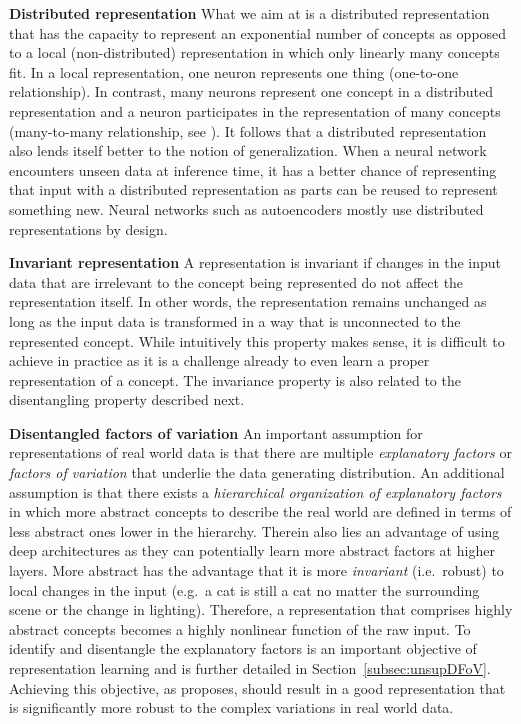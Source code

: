 \documentclass[a4paper,12pt]{report}
\begin{document}
\textbf{Distributed representation}
What we aim at is a distributed representation that has the capacity to represent an exponential number of concepts as opposed to a local (non-distributed) representation in which only linearly many concepts fit. In a local representation, one neuron represents one thing (one-to-one relationship). In contrast, many neurons represent one concept in a distributed representation and a neuron participates in the representation of many concepts (many-to-many relationship, see \cite{DistrRepHinton}). It follows that a distributed representation also lends itself better to the notion of generalization. When a neural network encounters unseen data at inference time, it has a better chance of representing that input with a distributed representation as parts can be reused to represent something new. Neural networks such as autoencoders mostly use distributed representations by design.

\textbf{Invariant representation}
A representation is invariant if changes in the input data that are irrelevant to the concept being represented do not affect the representation itself. In other words, the representation remains unchanged as long as the input data is transformed in a way that is unconnected to the represented concept. While intuitively this property makes sense, it is difficult to achieve in practice as it is a challenge already to even learn a proper representation of a concept. The invariance property is also related to the disentangling property described next.

\textbf{Disentangled factors of variation} An important assumption for representations of real world data is that there are multiple \textit{explanatory factors} or \textit{factors of variation} that underlie the data generating distribution. An additional assumption is that there exists a \textit{hierarchical organization of explanatory factors} in which more abstract concepts to describe the real world are defined in terms of less abstract ones lower in the hierarchy. Therein also lies an advantage of using deep architectures as they can potentially learn more abstract factors at higher layers. More abstract has the advantage that it is more \textit{invariant} (i.e.\ robust) to local changes in the input (e.g.\ a cat is still a cat no matter the surrounding scene or the change in lighting). Therefore, a representation that comprises highly abstract concepts becomes a highly nonlinear function of the raw input. To identify and disentangle the explanatory factors is an important objective of representation learning and is further detailed in Section~\ref{subsec:unsupDFoV}. Achieving this objective, as \cite{ReprLearning} proposes, should result in a good representation that is significantly more robust to the complex variations in real world data. 
\end{document}
